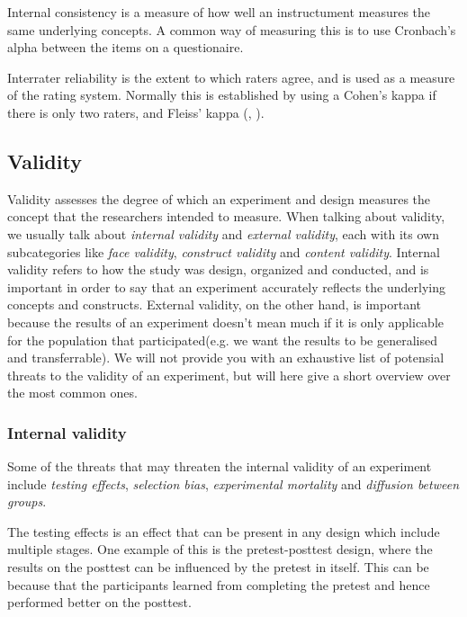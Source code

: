 	\bigskip\noindent
	Internal consistency is a measure of how well an instructument measures the same underlying concepts. A common way of measuring this is to use Cronbach's alpha between the items on a questionaire.
	
	\bigskip\noindent
	Interrater reliability is the extent to which raters agree, and is used as a measure of the rating system. Normally this is established by using a Cohen's kappa if there is only two raters, and Fleiss' kappa (\cite{gwet2001handbook}, \cite{shrout1979intraclass}).
	
\subsection{Validity}
	Validity assesses the degree of which an experiment and design measures the concept that the researchers intended to measure.
	When talking about validity, we usually talk about \textit{internal validity} and \textit{external validity}, each with its own subcategories like \textit{face validity}, \textit{construct validity} and \textit{content validity}.
	Internal validity refers to how the study was design, organized and conducted, and is important in order to say that an experiment
 accurately reflects the underlying concepts and constructs. 
External validity, on the other hand, is important because the results of an experiment doesn't mean much if it is only applicable for the population that participated(e.g. we want the results to be generalised and transferrable).
	We will not provide you with an exhaustive list of potensial threats to the validity of an experiment, but will here give a short overview over the most common ones.
	
	\subsubsection{Internal validity}
	Some of the threats that may threaten the internal validity of an experiment include \textit{testing effects}, \textit{selection bias}, \textit{experimental mortality} and \textit{diffusion between groups}.
	
	\bigskip\noindent
	The testing effects is an effect that can be present in any design which include multiple stages. 
	One example of this is the pretest-posttest design, where the results on the posttest can be influenced by the pretest in itself. 
	This can be because that the participants learned from completing the pretest and hence performed better on the posttest.
	
